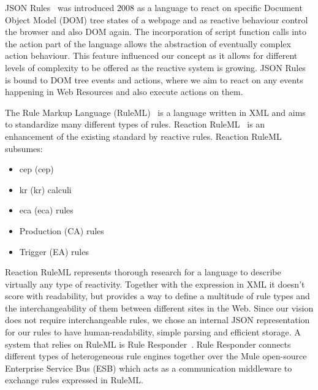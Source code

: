 \textrm{JSON Rules}~\cite{2008-Giurca_Pascalau-JSON_Rules.pdf} was introduced 2008 as a language to react on specific \textrm{Document Object Model} (\textrm{DOM}) tree states of a webpage and as reactive behaviour control the browser and also \textrm{DOM} again.
The incorporation of script function calls into the action part of the language allows the abstraction of eventually complex action behaviour.
This feature influenced our concept as it allows for different levels of complexity to be offered as the reactive system is growing.
\textrm{JSON Rules} is bound to \textrm{DOM} tree events and actions, where we aim to react on any events happening in Web Resources and also execute actions on them.

The \textrm{Rule Markup Language} (\textrm{RuleML})~\cite{2006-Boley-RuleML.pdf} is a language written in \textrm{XML} and aims to standardize many different types of rules.
\textrm{Reaction RuleML}~\cite{2012-Paschke_etal-ReactionRuleML.pdf} is an enhancement of the existing standard by reactive rules.
\textrm{Reaction RuleML} subsumes:
\begin{itemize}
  \item \textrm{\acrlong{cep} (\acrshort{cep})}
  \item \textrm{\acrlong{kr} (\acrshort{kr})} calculi
  \item \textrm{\acrlong{eca} (\acrshort{eca})} rules
  \item Production (\textrm{CA}) rules
  \item Trigger (\textrm{EA}) rules
\end{itemize}
\textrm{Reaction RuleML} represents thorough research for a language to describe virtually any type of reactivity.
Together with the expression in \textrm{XML} it doesn't score with readability, but provides a way to define a multitude of rule types and the interchangeability of them between different sites in the Web.
Since our vision does not require interchangeable rules, we chose an internal JSON representation for our rules to have human-readability, simple parsing and efficient storage.
A system that relies on \textrm{RuleML} is \textrm{Rule Responder}~\cite{2007-Paschke_etal-RuleResponder.pdf}.
\textrm{Rule Responder} connects different types of heterogeneous rule engines together over the \textrm{Mule} open-source \textrm{Enterprise Service Bus} (\textrm{ESB}) which acts as a communication middleware to exchange rules expressed in \textrm{RuleML}.


